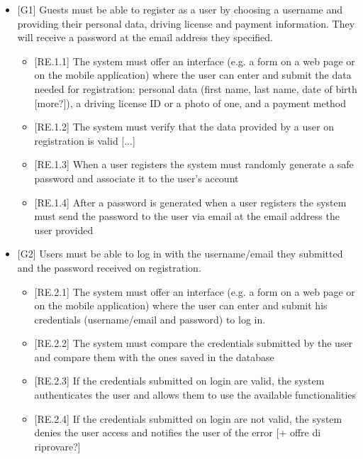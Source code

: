 \documentclass[english]{article}
\begin{document}
\begin{itemize}

\item{[G1] Guests must be able to register as a user by choosing a username and providing their personal data, driving license and payment information. They will receive a password at the email address they specified.
	
\begin{itemize}
\item{[RE.1.1] The system must offer an interface (e.g. a form on a web page or on the mobile application) where the user can enter and submit the data needed for registration: personal data (first name, last name, date of birth [more?]), a driving license ID or a photo of one, and a payment method}
\item{[RE.1.2] The system must verify that the data provided by a user on registration is valid [...]}
\item{[RE.1.3] When a user registers the system must randomly generate a safe password and associate it to the user’s account}
\item{[RE.1.4] After a password is generated when a user registers the system must send the password to the user via email at the email address the user provided}
\end{itemize}
}

\item{[G2] Users must be able to log in with the username/email they submitted and the password received on registration.
\begin{itemize}
	\item{[RE.2.1] The system must offer an interface (e.g. a form on a web page or on the mobile application) where the user can enter and submit his credentials (username/email and password) to log in.}
	\item{[RE.2.2] The system must compare the credentials submitted by the user and compare them with the ones saved in the database}
	\item{[RE.2.3] If the credentials submitted on login are valid, the system authenticates the user and allows them to use the available functionalities}
	\item{[RE.2.4] If the credentials submitted on login are not valid, the system denies the user access and notifies the user of the error}
[+ offre di riprovare?]
\end{itemize}
}


\end{itemize}
\end{document}
